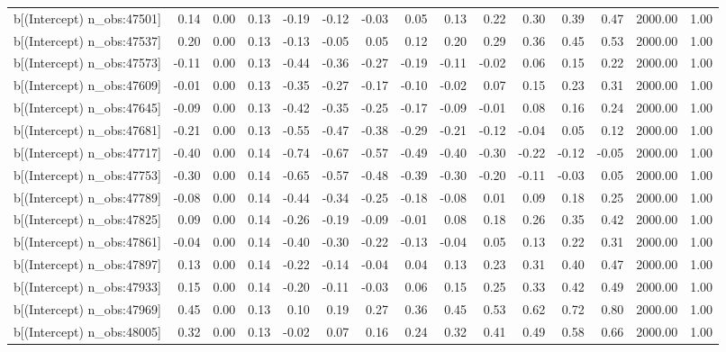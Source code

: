 \begin{table}[ht]
\begin{tabular}{rrrrrrrrrrrrrrr}
  b[(Intercept) n\_obs:47501] & 0.14 & 0.00 & 0.13 & -0.19 & -0.12 & -0.03 & 0.05 & 0.13 & 0.22 & 0.30 & 0.39 & 0.47 & 2000.00 & 1.00 \\ 
  b[(Intercept) n\_obs:47537] & 0.20 & 0.00 & 0.13 & -0.13 & -0.05 & 0.05 & 0.12 & 0.20 & 0.29 & 0.36 & 0.45 & 0.53 & 2000.00 & 1.00 \\ 
  b[(Intercept) n\_obs:47573] & -0.11 & 0.00 & 0.13 & -0.44 & -0.36 & -0.27 & -0.19 & -0.11 & -0.02 & 0.06 & 0.15 & 0.22 & 2000.00 & 1.00 \\ 
  b[(Intercept) n\_obs:47609] & -0.01 & 0.00 & 0.13 & -0.35 & -0.27 & -0.17 & -0.10 & -0.02 & 0.07 & 0.15 & 0.23 & 0.31 & 2000.00 & 1.00 \\ 
  b[(Intercept) n\_obs:47645] & -0.09 & 0.00 & 0.13 & -0.42 & -0.35 & -0.25 & -0.17 & -0.09 & -0.01 & 0.08 & 0.16 & 0.24 & 2000.00 & 1.00 \\ 
  b[(Intercept) n\_obs:47681] & -0.21 & 0.00 & 0.13 & -0.55 & -0.47 & -0.38 & -0.29 & -0.21 & -0.12 & -0.04 & 0.05 & 0.12 & 2000.00 & 1.00 \\ 
  b[(Intercept) n\_obs:47717] & -0.40 & 0.00 & 0.14 & -0.74 & -0.67 & -0.57 & -0.49 & -0.40 & -0.30 & -0.22 & -0.12 & -0.05 & 2000.00 & 1.00 \\ 
  b[(Intercept) n\_obs:47753] & -0.30 & 0.00 & 0.14 & -0.65 & -0.57 & -0.48 & -0.39 & -0.30 & -0.20 & -0.11 & -0.03 & 0.05 & 2000.00 & 1.00 \\ 
  b[(Intercept) n\_obs:47789] & -0.08 & 0.00 & 0.14 & -0.44 & -0.34 & -0.25 & -0.18 & -0.08 & 0.01 & 0.09 & 0.18 & 0.25 & 2000.00 & 1.00 \\ 
  b[(Intercept) n\_obs:47825] & 0.09 & 0.00 & 0.14 & -0.26 & -0.19 & -0.09 & -0.01 & 0.08 & 0.18 & 0.26 & 0.35 & 0.42 & 2000.00 & 1.00 \\ 
  b[(Intercept) n\_obs:47861] & -0.04 & 0.00 & 0.14 & -0.40 & -0.30 & -0.22 & -0.13 & -0.04 & 0.05 & 0.13 & 0.22 & 0.31 & 2000.00 & 1.00 \\ 
  b[(Intercept) n\_obs:47897] & 0.13 & 0.00 & 0.14 & -0.22 & -0.14 & -0.04 & 0.04 & 0.13 & 0.23 & 0.31 & 0.40 & 0.47 & 2000.00 & 1.00 \\ 
  b[(Intercept) n\_obs:47933] & 0.15 & 0.00 & 0.14 & -0.20 & -0.11 & -0.03 & 0.06 & 0.15 & 0.25 & 0.33 & 0.42 & 0.49 & 2000.00 & 1.00 \\ 
  b[(Intercept) n\_obs:47969] & 0.45 & 0.00 & 0.13 & 0.10 & 0.19 & 0.27 & 0.36 & 0.45 & 0.53 & 0.62 & 0.72 & 0.80 & 2000.00 & 1.00 \\ 
  b[(Intercept) n\_obs:48005] & 0.32 & 0.00 & 0.13 & -0.02 & 0.07 & 0.16 & 0.24 & 0.32 & 0.41 & 0.49 & 0.58 & 0.66 & 2000.00 & 1.00 \\ 

\end{tabular}
\end{table}
